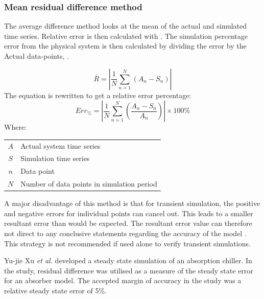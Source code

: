  		\subsubsection{Mean residual difference method}
 			The average difference method looks at the mean of the actual and simulated time series. Relative error is then calculated with . The simulation percentage error from the physical system is then calculated by dividing the error by the Actual data-points, .
 			
 			\begin{equation}
 			\label{eq: AMean absolute}
 			\bar{R} = \left| \dfrac{1}{N} \sum_{n=1}^{N}{ \left( A_{n} - S_{n}\right)} \right|
 			\end{equation}
The equation is rewritten to get a relative error percentage:	
 			\begin{equation}
 				\label{eq: Average difference}
 				Err_{\%} = \left| \dfrac{1}{N} \sum_{n=1}^{N}{ \left(\dfrac{ A_{n} - S_{n}}{A_n}\right)} \right| \times 100 \%
 			\end{equation}
 			Where: \par 
 				\begin{table}[!htbp]
 					\centering
 					\begin{tabular}{cl}
 						$A$ & Actual system time series \\
 						$S$ & Simulation time series \\
 						$n$ & Data point \\
 						$N$ & Number of data points in simulation period \\
 					\end{tabular} 
 				\end{table}	
 			A major disadvantage of this method is that for transient simulation, the positive and negative errors for individual points can cancel out. This leads to a smaller resultant error than would be expected. The resultant error value can therefore not direct to any conclusive statements regarding the accuracy of the model \cite{sarin2010comparing}. This strategy is not recommended if used alone to verify transient simulations. 
 			\par 
 						
 			Yu-jie Xu \textit{et al.} \cite{xu2016modeling} developed a steady state simulation of an absorption chiller. In the study, residual difference was utilised as a measure of the steady state error for an absorber model. The accepted margin of accuracy in the study was a relative steady state error of 5\%. 
 			
